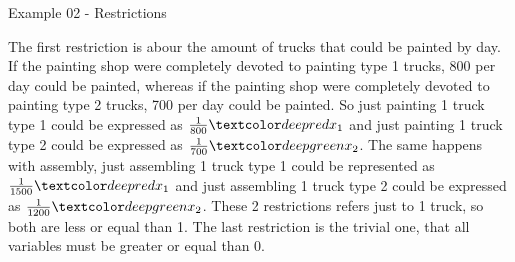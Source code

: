 \begin{frame}{Example 02 - Restrictions}

The first restriction is abour the amount of trucks that could be painted by
day. If the painting shop were completely devoted to painting type 1 trucks, 800
per day could be painted, whereas if the painting shop were completely devoted
to painting type 2 trucks, 700 per day could be painted.
So just painting 1 truck type 1 could be expressed as $\frac{1}{800}\colora{x_1}$
and just painting 1 truck type 2 could be expressed as $\frac{1}{700}\colorb{x_2}$.
The same happens with assembly, just assembling 1 truck type 1 could be
represented as $\frac{1}{1500}\colora{x_1}$ and just assembling 1 truck type 2
could be expressed as $\frac{1}{1200}\colorb{x_2}$. These 2 restrictions refers
just to 1 truck, so both are less or equal than 1. The last restriction is the
trivial one, that all variables must be greater or equal than 0.

\end{frame}
